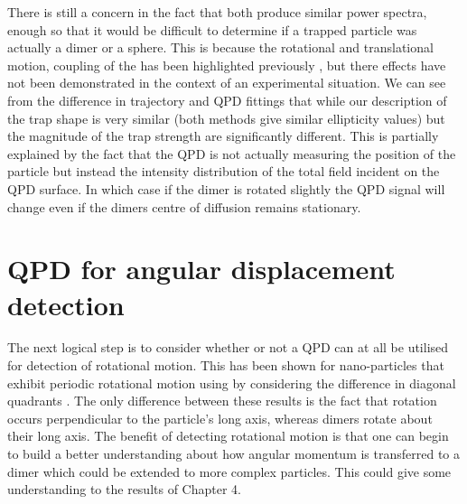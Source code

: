 There is still a concern in the fact that both produce similar
power spectra, enough so that it would be difficult to determine
if a trapped particle was actually a dimer or a sphere. This is
because the rotational and translational motion, coupling of the 
has been highlighted previously \cite{Vigilante2020}, but there 
effects have not been demonstrated in the context of an experimental situation. We can see from the difference in trajectory and QPD 
fittings that while our description of the trap shape is very 
similar (both methods give similar ellipticity values) but the 
magnitude of the trap strength are significantly different. This 
is partially explained by the fact that the QPD is not actually 
measuring the position of the particle but instead the intensity 
distribution of the total field incident on the QPD surface. In 
which case if the dimer is rotated slightly the QPD signal will 
change even if the dimers centre of diffusion remains stationary. 

\section{QPD for angular displacement detection}
\label{sec:angular_displacement}
The next logical step is to consider whether or not a QPD can at 
all be utilised for detection of rotational motion. This has been
shown for nano-particles that exhibit periodic rotational motion
using by considering the difference in diagonal quadrants 
\cite{Yifat2021}. The only difference between these results is 
the fact that rotation occurs perpendicular to the particle's long 
axis, whereas dimers rotate about their long axis. The benefit of 
detecting rotational motion is that one can begin to build a better understanding about how angular momentum is transferred to a dimer 
which could be extended to more complex particles. This could give 
some understanding to the results of Chapter 4. 

